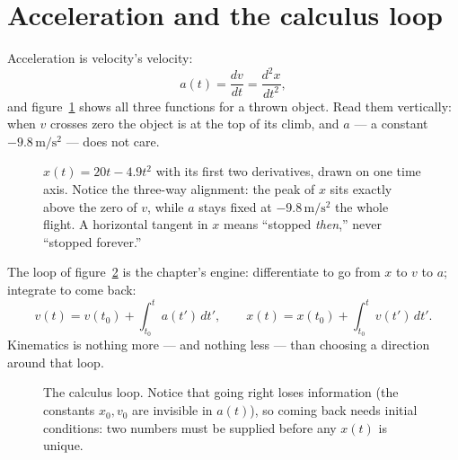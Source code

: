 \section{Acceleration and the calculus loop}\label{sec:kin-acc}

Acceleration is velocity's velocity:
\[
  a(t)=\frac{dv}{dt}=\frac{d^{2}x}{dt^{2}},
\]
and figure~\ref{fig:triple} shows all three functions for a thrown object.
Read them vertically: when $v$ crosses zero the object is at the top of its
climb, and $a$ --- a constant $-9.8\,\mathrm{m/s^{2}}$ --- does not care.

\begin{figure}[htbp]\centering

\caption{$x(t)=20t-4.9t^{2}$ with its first two derivatives, drawn on one
time axis. Notice the three-way alignment: the peak of $x$ sits exactly above
the zero of $v$, while $a$ stays fixed at $-9.8\,\mathrm{m/s^{2}}$ the whole
flight. A horizontal tangent in $x$ means ``stopped \emph{then},'' never
``stopped forever.''}
\label{fig:triple}
\end{figure}

The loop of figure~\ref{fig:loop} is the chapter's engine: differentiate to go
from $x$ to $v$ to $a$; integrate to come back:
\[
  v(t)=v(t_0)+\int_{t_0}^{t}a(t')\,dt',\qquad
  x(t)=x(t_0)+\int_{t_0}^{t}v(t')\,dt'.
\]
Kinematics is nothing more --- and nothing less --- than choosing a direction
around that loop.

\begin{figure}[htbp]\centering

\caption{The calculus loop. Notice that going right loses information (the
constants $x_0,v_0$ are invisible in $a(t)$), so coming back needs initial
conditions: two numbers must be supplied before any $x(t)$ is unique.}
\label{fig:loop}
\end{figure}

